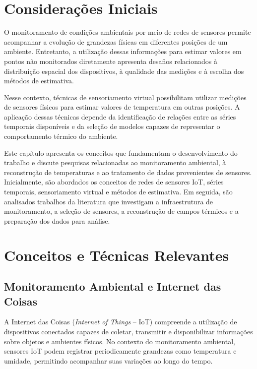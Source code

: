 \label{sec:revisao}

\section{Considerações Iniciais}

O monitoramento de condições ambientais por meio de redes de sensores permite acompanhar a evolução de grandezas físicas em diferentes posições de um ambiente. Entretanto, a utilização dessas informações para estimar valores em pontos não monitorados diretamente apresenta desafios relacionados à distribuição espacial dos dispositivos, à qualidade das medições e à escolha dos métodos de estimativa.

Nesse contexto, técnicas de sensoriamento virtual possibilitam utilizar medições de sensores físicos para estimar valores de temperatura em outras posições. A aplicação dessas técnicas depende da identificação de relações entre as séries temporais disponíveis e da seleção de modelos capazes de representar o comportamento térmico do ambiente.

Este capítulo apresenta os conceitos que fundamentam o desenvolvimento do trabalho e discute pesquisas relacionadas ao monitoramento ambiental, à reconstrução de temperaturas e ao tratamento de dados provenientes de sensores. Inicialmente, são abordados os conceitos de redes de sensores IoT, séries temporais, sensoriamento virtual e métodos de estimativa. Em seguida, são analisados trabalhos da literatura que investigam a infraestrutura de monitoramento, a seleção de sensores, a reconstrução de campos térmicos e a preparação dos dados para análise.


\section{Conceitos e Técnicas Relevantes}
\label{sec:conceitos}


\subsection{Monitoramento Ambiental e Internet das Coisas}
\label{subsec:iot}

A Internet das Coisas (\textit{Internet of Things} -- IoT) compreende a utilização de dispositivos conectados capazes de coletar, transmitir e disponibilizar informações sobre objetos e ambientes físicos. No contexto do monitoramento ambiental, sensores IoT podem registrar periodicamente grandezas como temperatura e umidade, permitindo acompanhar suas variações ao longo do tempo.

